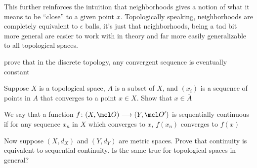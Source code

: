 \documentclass{pset}
\begin{document}
This further reinforces the intuition that neighborhoods gives a notion of what it means to be ``close'' to a given point $x$. Topologically speaking, neighborhoods are completely equivalent to $\epsilon$ balls, it's just that neighborhoods, being a tad bit more general are easier to work with in theory and far more easily generalizable to all topological spaces.
\begin{exercise}[\skipforward]
    prove that in the discrete topology, any convergent sequence is eventually constant
\end{exercise}
\begin{exercise}[\skipforward]
    Suppose $X$ is a topological space, $A$ is a subset of $X$, and $(x_i)$ is a sequence of points in $A$ that converges to a point $x\in X$. Show that $x\in\overline A$
\end{exercise}
\begin{definition}
    We say that a function $f\colon (X, \mcl O) \longrightarrow (Y, \mcl O')$ is sequentially continuous if for any sequence $x_n$ in $X$ which converges to $x$, $f(x_n)$ converges to $f(x)$
\end{definition}


\begin{exercise}[\skipforward]
    Now suppose $(X, d_X)$ and $(Y, d_Y)$ are metric spaces. Prove that continuity is equivalent to sequential continuity. Is the same true for topological spaces in general?
\end{exercise}
\end{document}
